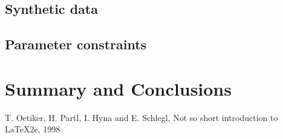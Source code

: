 \documentclass{wihuri}
\begin{document}
\subsection{Synthetic data}

\subsection{Parameter constraints}

\section{Summary and Conclusions}










\iffalse
\begin{figure}
\begin{center}
\setlength{\unitlength}{1cm}
\begin{picture}(6,6)(-3,-3)
\put(-1.5,0){\vector(1,0){3}}
\put(2.7,-0.1){$\chi$}
\put(0,-1.5){\vector(0,1){3}}
\multiput(-2.5,1)(0.4,0){13}
{\line(1,0){0.2}}
\multiput(-2.5,-1)(0.4,0){13}
{\line(1,0){0.2}}
\put(0.2,1.4)
{$\beta=v/c=\tanh\chi$}
\qbezier(0,0)(0.8853,0.8853)
(2,0.9640)
\qbezier(0,0)(-0.8853,-0.8853)
(-2,-0.9640)
\end{picture}
\caption{Tässä on hieno kuva}
\label{kuva1}
\end{center}
\end{figure}
\fi


\newpage
\renewcommand{\baselinestretch}{1}\large\normalsize
%
\begin{thebibliography}{50}%
 T. Oetiker, H. Partl, I. Hyna and E. Schlegl,
Not so short introduction to \LaTeX 2e, 1998
\end{thebibliography}
%
%
%
%
%
%
\end{document}
